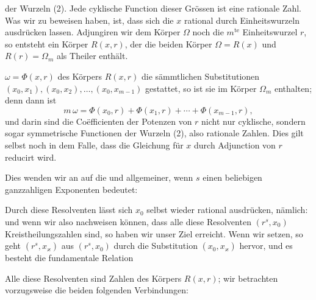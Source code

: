 der Wurzeln (2). Jede cyklische Function dieser Grössen ist
eine rationale Zahl. Was wir zu beweisen haben, ist, dass sich
die $x$ rational durch Einheitswurzeln ausdrücken lassen. Adjungiren
wir dem Körper $\Omega$ noch die $m^{\mathrm{te}}$ Einheitswurzel $r$, so entsteht
ein Körper $R(x, r)$, der die beiden Körper $\Omega = R(x)$ und
$R(r) = \Omega_m$ als Theiler enthält.

 $\omega = \Phi(x, r)$ des Körpers $R(x, r)$ die
sämmtlichen Substitutionen $(x_0, x_1), (x_0, x_2), \ldots, (x_0, x_{m-1})$ gestattet,
so ist sie im Körper $\Omega_m$ enthalten; denn dann ist
\[
m\,\omega = \Phi(x_0, r) + \Phi(x_1, r) + \cdots + \Phi(x_{m-1}, r),
\]
und darin sind die Coëfficienten der Potenzen von $r$ nicht nur
cyklische, sondern sogar symmetrische Functionen der Wurzeln
(2), also rationale Zahlen. Dies gilt selbst noch in dem
Falle, dass die Gleichung für $x$ durch Adjunction von $r$ reducirt
wird.

Dies wenden wir an auf die 
und allgemeiner, wenn $s$ einen beliebigen ganzzahligen Exponenten
 bedeutet:

Durch diese Resolventen lässt sich $x_0$ selbst wieder rational
ausdrücken, nämlich:
und wenn wir also nachweisen können, dass alle diese Resolventen
 $(r^s, x_0)$ Kreistheilungszahlen sind, so haben wir unser
Ziel erreicht. Wenn wir
setzen, so geht $(r^s, x_{\varkappa})$ aus $(r^s, x_0)$ durch die Substitution
$(x_0, x_{\varkappa})$ hervor, und es besteht die fundamentale Relation

Alle diese Resolventen sind Zahlen des Körpers $R(x, r)$;
wir betrachten vorzugsweise die beiden folgenden Verbindungen:
